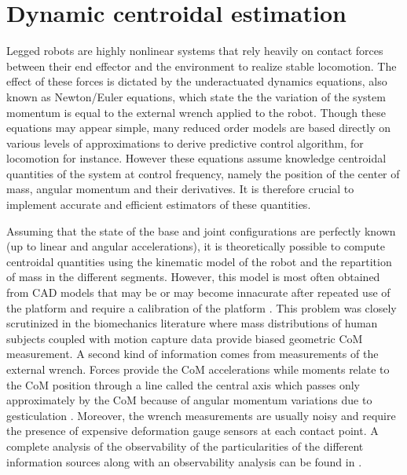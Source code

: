 \section{Dynamic centroidal estimation}
Legged robots are highly nonlinear systems that rely heavily on contact forces between their end effector and the environment to realize stable locomotion. 
The effect of these forces is dictated by the underactuated dynamics equations, also known as Newton/Euler equations, which state the the variation of the 
system momentum is equal to the external wrench applied to the robot. Though these equations may appear simple, many reduced order models are based directly on 
various levels of approximations \cite{kajita20013d, wieber2006trajectory, carpentier2016versatile} to derive predictive
control algorithm, for locomotion for instance. However these equations assume knowledge centroidal quantities of the system at control frequency, 
namely the position of the center of mass, angular momentum and their derivatives. It is therefore crucial to implement accurate and efficient estimators of these quantities.

Assuming that the state of the base and joint configurations are perfectly known (up to linear and angular accelerations), it is theoretically possible 
to compute centroidal quantities using the kinematic model of the robot and the repartition of mass in the different segments. 
However, this model is most often obtained from CAD models that may be or may become innacurate after repeated use of the platform and require a calibration of
the platform \cite{ayusawa2008identification, bonnet2019overview} . This problem was closely scrutinized in the biomechanics literature where mass distributions of human subjects coupled with 
motion capture data  provide biased geometric CoM measurement. A second kind of information comes from measurements of the external
wrench. Forces provide the CoM accelerations while moments relate to the CoM position through a line called the central axis which passes only approximately by
the CoM because of angular momentum variations due to gesticulation \cite{wieber2006holonomy}. Moreover, the wrench measurements are usually noisy
and require the presence of expensive deformation gauge sensors at each contact point. A complete analysis of the observability of the particularities
of the different information sources along with an observability analysis can be found in \cite{carpentier2016center}.

